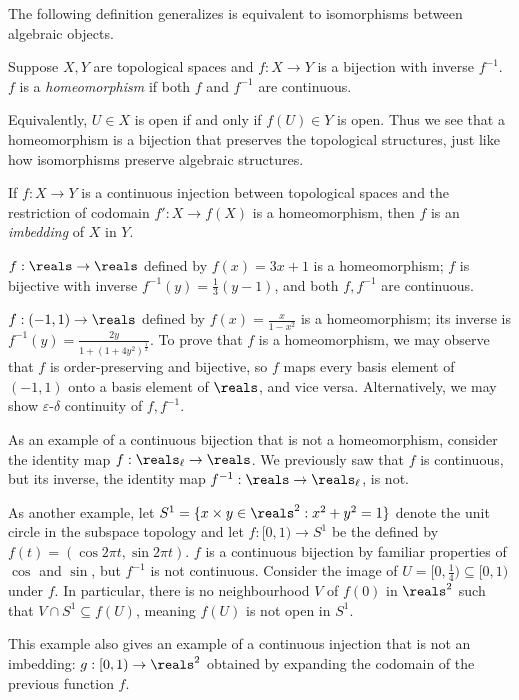 The following definition generalizes is equivalent to isomorphisms between algebraic objects.
\begin{definition}\label{2.36}
    Suppose $X, Y$ are topological spaces and $f: X \rightarrow Y$ is a bijection with inverse $f^{-1}$. $f$ is a {\it homeomorphism} if both $f$ and $f^{-1}$ are continuous.
\end{definition}
Equivalently, $U \in X$ is open if and only if $f(U) \in Y$ is open. Thus we see that a homeomorphism is a bijection that preserves the topological structures, just like how isomorphisms preserve algebraic structures.

\begin{definition}\label{2.37}
    If $f: X \rightarrow Y$ is a continuous injection between topological spaces and the restriction of codomain $f': X \rightarrow f(X)$ is a homeomorphism, then $f$ is an {\it imbedding} of $X$ in $Y.$
\end{definition}
$f: \reals \rightarrow \reals$ defined by $f(x) = 3x+1$ is a homeomorphism; $f$ is bijective with inverse $f^{-1}(y) = \frac13(y-1)$, and both $f, f^{-1}$ are continuous.

$f:(-1, 1) \rightarrow \reals$ defined by $f(x) = \frac{x}{1-x^2}$ is a homeomorphism; its inverse is $f^{-1}(y) = \frac{2y}{1+(1+4y^2)^\frac12}$. To prove that $f$ is a homeomorphism, we may observe that $f$ is order-preserving and bijective, so $f$ maps every basis element of $(-1, 1)$ onto a basis element of $\reals$, and vice versa. Alternatively, we may show $\varepsilon$-$\delta$ continuity of $f, f^{-1}$.

As an example of a continuous bijection that is not a homeomorphism, consider the identity map $f: \reals_\ell \rightarrow \reals$. We previously saw that $f$ is continuous, but its inverse, the identity map $f^{-1}: \reals \rightarrow \reals_\ell$, is not.

As another example, let $S^1 = \{x \times y \in \reals^2 : x^2 + y^2 = 1\}$ denote the unit circle in the subspace topology and let $f: [0, 1) \rightarrow S^1$ be the defined by $f(t) = (\cos 2\pi t, \sin 2\pi t)$. $f$ is a continuous bijection by familiar properties of $\cos$ and $\sin$, but $f^{-1}$ is not continuous. Consider the image of $U = [0, \frac14) \subseteq [0, 1)$ under $f$. In particular, there is no neighbourhood $V$ of $f(0)$ in $\reals^2$ such that $V \cap S^1 \subseteq f(U)$, meaning $f(U)$ is not open in $S^1$.

This example also gives an example of a continuous injection that is not an imbedding: $g: [0, 1) \rightarrow \reals^2$ obtained by expanding the codomain of the previous function $f$.

